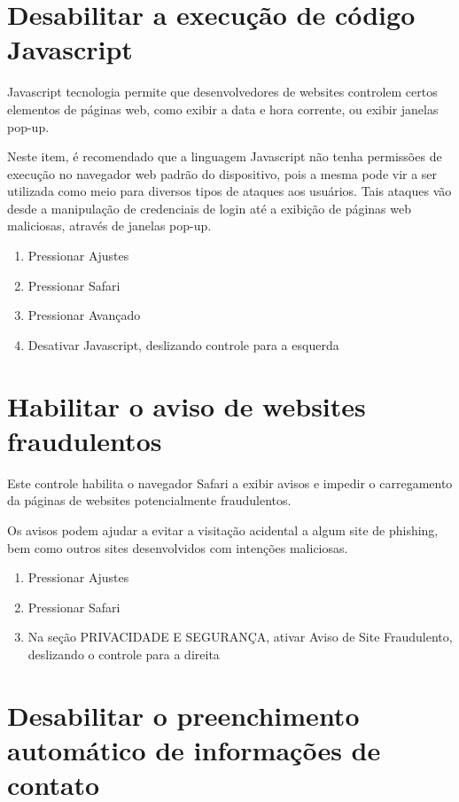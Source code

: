 \section{Desabilitar a execu\c c\~ao de c\'odigo Javascript}

Javascript tecnologia permite que desenvolvedores de websites controlem certos elementos de p\'aginas web, como exibir a data e hora corrente, ou exibir janelas pop-up. 

Neste item, \'e recomendado que a linguagem Javascript n\~ao tenha permiss\~oes de execu\c c\~ao no navegador web padr\~ao do dispositivo, pois a mesma pode vir a ser utilizada como meio para diversos tipos de ataques aos usu\'arios. Tais ataques v\~ao desde a manipula\c c\~ao de credenciais de login at\'e a exibi\c c\~ao de p\'aginas web maliciosas, atrav\'es de janelas pop-up.

\begin{enumerate}
\item Pressionar Ajustes
\item Pressionar Safari
\item Pressionar Avan\c cado
\item Desativar Javascript, deslizando  controle para a esquerda
\end{enumerate}

\section{Habilitar o aviso de websites fraudulentos}

Este controle habilita o navegador Safari a exibir avisos e impedir o carregamento da p\'aginas de websites potencialmente fraudulentos.

Os avisos podem ajudar a evitar a visita\c c\~ao acidental a algum site de phishing, bem como outros sites desenvolvidos com inten\c c\~oes maliciosas.

\begin{enumerate}
\item Pressionar Ajustes
\item Pressionar Safari
\item Na se\c c\~ao PRIVACIDADE E SEGURAN\c CA, ativar Aviso de Site Fraudulento, deslizando o controle para a direita
\end{enumerate}

\section{Desabilitar o preenchimento autom\'atico de informa\c c\~oes de contato}

